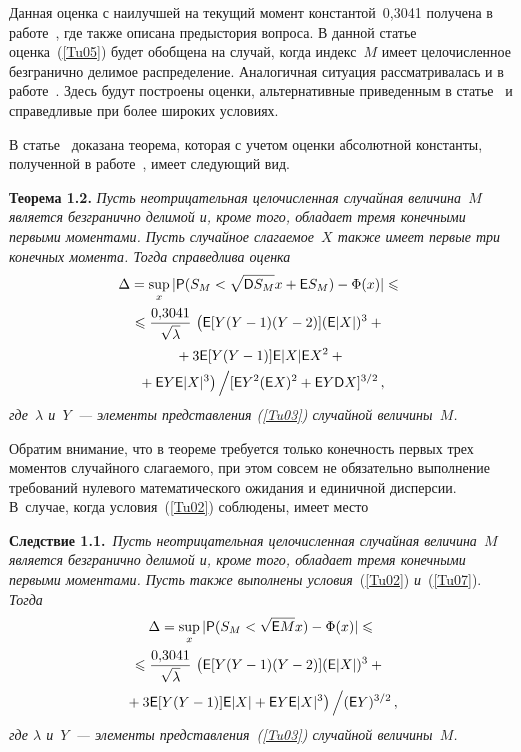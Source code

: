 \begin{multicols}{2}
\medskip

Данная оценка с наилучшей на текущий момент константой~0,3041
получена в работе~\cite{2g}, где также описана предыстория вопроса.
В данной статье оценка~(\ref{Tu05}) будет обобщена на случай,
когда индекс~$M$ имеет целочисленное безгранично делимое
распределение. Аналогичная ситуация рассматривалась и в работе~\cite{5g}. 
Здесь будут построены оценки, альтернативные приведенным
в статье~\cite{5g} и справедливые при более широких условиях.

В статье~\cite{5g} доказана теорема, которая с учетом оценки
абсолютной константы, полученной в работе~\cite{2g}, имеет
следующий вид.

\medskip

\noindent
\textbf{Теорема 1.2.}
\textit{Пусть неотрицательная целочисленная случайная величина~$M$
является безгранично делимой и, кроме того, обладает тремя
конечными первыми моментами. Пусть случайное слагаемое~$X$ также
имеет первые три конечных момента. Тогда справедлива оценка}
\begin{multline}
\Delta = \sup\limits_{x}|{\sf P}(S_{M}<\sqrt{{\sf D} S_M}x + {\sf E}
S_M)-\Phi(x)| \leqslant{}\\
\leqslant \displaystyle\frac{\displaystyle 0{,}3041\mathstrut}{\displaystyle \sqrt{\lambda}\mathstrut} \,
\left({\sf E}[Y(Y-1)(Y-2)]({\sf E}|X|)^3 + {}\right.\\
\left.{}+3{\sf E}[Y(Y-1)]{\sf E}|X|{\sf E} {X}^2 +{}\right.\\
\left.{}+ {\sf E} Y
 {\sf E}|X|^3\right)\Big /
 [{\sf E} Y^2  ({\sf E} X)^2 +{\sf E} Y  {\sf D} X]^{3/2}\,,
\end{multline}
\textit{где~$\lambda$ и~$Y$~--- элементы представления {\rm (\ref{Tu03})}
случайной величины~$M$.}

\medskip

Обратим внимание, что в теореме требуется только конечность первых
трех моментов случайного слагаемого, при этом совсем не
обязательно выполнение требований нулевого математического
ожидания и единичной дисперсии. В~случае, когда условия~(\ref{Tu02}) соблюдены, имеет место


\smallskip


\noindent
\textbf{Следствие 1.1.}~\textit{Пусть неотрицательная целочисленная случайная величина~$M$
является безгранично делимой и, кроме того, обладает тремя
конечными первыми моментами. Пусть также выполнены условия}~(\ref{Tu02}) \textit{и}~(\ref{Tu07}). \textit{Тогда}
\begin{multline}
\Delta = \sup\limits_{x}|{\sf P}(S_{M}<\sqrt{{\sf E} M}x)-\Phi(x)| \leqslant
\\
\leqslant \displaystyle\frac{\displaystyle 0{,}3041\mathstrut}{\displaystyle \sqrt{\lambda}\mathstrut} \,\left(
{\sf E}[Y(Y-1)(Y-2)]({\sf E}|X|)^3 +{}\right.\\
\left.{}+ 3{\sf E}[Y(Y-1)]{\sf E}|X| + {\sf E} Y
{\sf E}|X|^3\right) \Big /({\sf E} Y)^{3/2}\,,
\label{Tu038}
\end{multline}
\textit{где $\lambda$ и~$Y$~--- элементы представления~{\rm (\ref{Tu03})}
случайной величины~$M$.}



\end{multicols}
